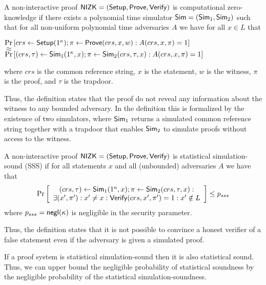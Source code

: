 \documentclass{llncs}
\begin{document}
\begin{defi}A non-interactive proof $\mathsf{NIZK} = (\mathsf{Setup}, \mathsf{Prove}, \mathsf{Verify})$ is computational zero-knowledge if there exists a polynomial time simulator $\mathsf{Sim} = (\mathsf{Sim}_1,\mathsf{Sim}_2)$ such that for all non-uniform polynomial time adversaries $A$ we have for all $x \in L$ that
	\begin{center}
		$\Pr \left[ crs \leftarrow \mathsf{Setup}(1^\kappa); \pi \leftarrow \mathsf{Prove}(crs,x,w): A(crs,x,\pi) = 1 \right]$\\
		$\approx$ \\
		$\Pr \left[ (crs,\tau) \leftarrow \mathsf{Sim}_1(1^\kappa,x); \pi \leftarrow \mathsf{Sim}_2(crs,\tau,x): A(crs,x,\pi) = 1 \right]$		
	\end{center}
where $crs$ is the common reference string, $x$ is the statement, $w$ is the witness, $\pi$ is the proof, and $\tau$ is the trapdoor.
\end{defi}

Thus, the definition states that the proof do not reveal any information about the witness to any bounded adversary.
In the definition this is formalized by the existence of two simulators, where $\mathsf{Sim}_1$ returns a simulated common reference string together with a trapdoor that enables $\mathsf{Sim}_2$ to simulate proofs without access to the witness.


\begin{defi}A non-interactive proof $\mathsf{NIZK} = (\mathsf{Setup}, \mathsf{Prove}, \mathsf{Verify})$ is statistical simulation-sound (SSS) if for all statements $x$ and all (unbounded) adversaries $A$ we have that
	\begin{align*}
	\Pr \left[ \begin{array}{c}
		(crs,\tau) \leftarrow \mathsf{Sim}_1(1^\kappa,x); \pi \leftarrow \mathsf{Sim}_2(crs,\tau,x):  \\
			\exists (x',\pi'): x' \neq x: \mathsf{Verify}(crs,x',\pi') = 1: x' \notin L
	\end{array} \right] \leq p_{sss} 
	\end{align*}
	where $p_{sss} = \mathsf{negl}(\kappa)$ is negligible in the security parameter.
\end{defi}

Thus, the definition states that it is not possible to convince a honest verifier of a false statement even if the adversary is given a simulated proof.


\begin{remark}
If a proof system is statistical simulation-sound then it is also statistical sound. Thus, we can upper bound the negligible probability of statistical soundness by the negligible probability of the statistical simulation-soundness. 
\end{remark}
\end{document}
